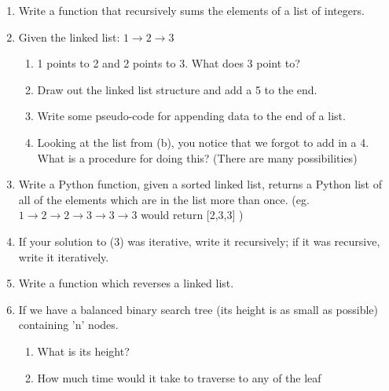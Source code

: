 \documentclass[11pt]{article}
\begin{document}

\begin{enumerate}
    \item Write a function that recursively sums the elements of a list of
          integers.
          \vspace{2.5in}

    \item Given the linked list: $1 \rightarrow 2 \rightarrow 3$
        \begin{enumerate}
            \item 1 points to 2 and 2 points to 3. What does 3 point to?
                \vspace{0.5in}
            \item Draw out the linked list structure and add a 5 to the end.
                \vspace{1.25in}
            \item Write some pseudo-code for appending data to the end of a list.
                \vspace{3.5in}
            \pagebreak
            \item Looking at the list from (b), you notice that we forgot to
                  add in a 4. What is a procedure for doing this? (There are
                  many possibilities)
                \vspace{2.5in}
        \end{enumerate}
    \item Write a Python function, given a sorted linked list, returns a Python
    list of all of the elements which are in the list more than once. (eg.
    $1\rightarrow2\rightarrow2\rightarrow3\rightarrow3\rightarrow3$ would return [2,3,3] )
        \vspace{3in}
    \item If your solution to (3) was iterative, write it recursively; if it
    was recursive, write it iteratively.
        \pagebreak
    \item Write a function which reverses a linked list.
        \vspace{4in}
    \item If we have a balanced binary search tree (its height is as small as
    possible) containing 'n' nodes.
        \begin{enumerate}
            \item What is its height?
                \vspace{.25in}
            \item How much time would it take to traverse to any of the leaf

\end{enumerate}
\end{enumerate}
\end{document}
